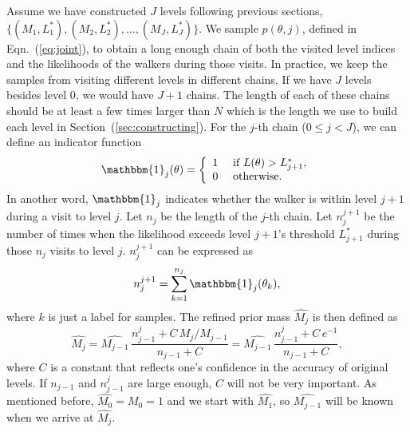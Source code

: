 \documentclass[letterpaper, preprint]{aastex}
\begin{document}
Assume we have constructed $J$ levels following previous sections, $\{(M_1,L_1^*),(M_2,L_2^*), \ldots,(M_J,L_J^*)\}$. We sample $p(\theta,j)$, defined in Eqn.~(\ref{eq:joint}), to obtain a long enough chain of both the visited level indices and the likelihoods of the walkers during those visits. In practice, we keep the samples from visiting different levels in different chains. If we have $J$ levels besides level 0, we would have $J+1$ chains. The length of each of these chains should be at least a few times larger than $N$ which is the length we use to build each level in Section~(\ref{sec:constructing}). For the $j$-th chain ($0\leq j<J$), we can define an indicator function
\begin{eqnarray}
\mathbbm{1}_j(\theta) = \left\{ \begin{array}{ll}
               1 & \mbox{ if } L(\theta)>L_{j+1}^*,\\
               0 & \mbox{ otherwise.} \end{array}  \right.
\end{eqnarray}
In another word, $\mathbbm{1}_j$ indicates whether the walker is within level $j+1$ during a visit to level $j$. Let $n_j$ be the length of the $j$-th chain. Let $n_j^{j+1}$ be the number of times when the likelihood exceeds level $j+1$'s threshold $L^*_{j+1}$ during those $n_j$ visits to level $j$. $n_{j}^{j+1}$ can be expressed as 
\begin{equation}
n_j^{j+1}=\sum_{k=1}^{n_j}\mathbbm{1}_j(\theta_k),
\end{equation}
where $k$ is just a label for samples. The refined prior mass $\widehat{M_j}$ is then defined as \citep{brewer11a}
\begin{equation}
\widehat{M_j} = \widehat{M_{j-1}} \, \frac{n_{j-1}^j+C \,  {M_j}/{M_{j-1}}}{n_{j-1}+C}= \widehat{M_{j-1}} \, \frac{n_{j-1}^j+C \,  e^{-1}}{n_{j-1}+C},
\label{eq:refinement}
\end{equation}
where $C$ is a constant that reflects one's confidence in the accuracy of original levels. If $n_{j-1}$ and $n_{j-1}^j$ are large enough, $C$ will not be very important. As mentioned before, $\widehat{M_0}=M_0=1$ and we start with $\widehat{M_1}$, so $\widehat{M_{j-1}}$ will be known when we arrive at $\widehat{M_j}$. 
\end{document}
